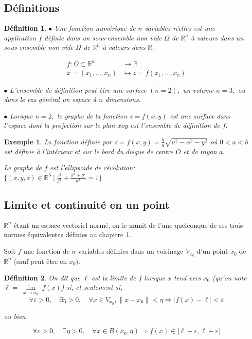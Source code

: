 \documentclass[11pt,a4paper]{report}
\newtheorem{definition}{Définition}[section]
\newtheorem{ex}{Exemple}[section]
\begin{document}
\subsection{Définitions}
\begin{definition}
$\bullet$ Une fonction numérique de $n$ variables réelles est une application $f$ définie dans un sous-ensemble non vide $\Omega$ de $\mathbb{R}^n$ à valeurs dans un sous-ensemble non vide $\Omega$ de $\mathbb{R}^n$ à valeurs dans $\mathbb{R}.$

\begin{align*}
f:\Omega\subset \mathbb{R}^n &\rightarrow \mathbb{R}\\
x=(x_1,...,x_n)&\mapsto z=f(x_1,...,x_n)
\end{align*}

$\bullet$ L'ensemble de définition peut être une surface $(n=2),$ un volume $n=3,$ ou dans le cas général un espace à $n$ dimensions.

$\bullet$ Lorsque $n=2,$ le graphe de la fonction $z=f(x,y)$ est une surface dans l'espace dont la projection sur le plan $xoy$ est l'ensemble de définition de $f.$
\end{definition}
\begin{ex}
La fonction définie par $z=f(x,y)=\frac{b}{a}\sqrt{a^2-x^2-y^2}$ où $0<a<b$ est définie à l'intérieur et sur le bord du disque de centre $O$ et de rayon $a.$

Le graphe de $f$ est l'ellipsoïde de révolution:\\
 $\{(x,y,z)\in \mathbb{R}^3\mid \frac{z^2}{b^2}+\frac{x^2+y^2}{a^2}=1\}$
\end{ex}
\subsection{Limite et continuité en un point}

$\mathbb{R}^n$ étant un espace vectoriel normé, on le munit de l'une quelconque de ses trois normes équivalentes définies au chapitre 1.

Soit $f$ une fonction de $n$ variables définies dans un voisinage $V_{x_0}$ d'un point $x_0$ de $\mathbb{R}^n$ (sauf peut être en $x_0$).

\begin{definition}
On dit que $\ell$ est la limite de $f$ lorsque $x$ tend vers $x_0$ (qu'on note $\ell= \lim\limits_{\substack{x \rightarrow x_0}} f(x)$) si, et seulement si,
$$\forall \varepsilon>0,\quad\exists \eta>0,\quad \forall x\in V_{x_0},\|x-x_0\|<\eta\Rightarrow |f(x)-\ell|<\varepsilon$$

ou bien

$$\forall \varepsilon>0,\quad\exists \eta>0,\quad \forall x\in B(x_0,\eta)\Rightarrow f(x)\in ]\ell-\varepsilon,\ell+\varepsilon[$$
\end{definition}
\end{document}
